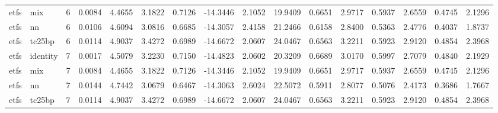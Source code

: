 \begin{tabular}{llrrrrrrrrrrrrrr}
etfs & mix & 6 & 0.0084 & 4.4655 & 3.1822 & 0.7126 & -14.3446 & 2.1052 & 19.9409 & 0.6651 & 2.9717 & 0.5937 & 2.6559 & 0.4745 & 2.1296 \\
etfs & nn & 6 & 0.0106 & 4.6094 & 3.0816 & 0.6685 & -14.3057 & 2.4158 & 21.2466 & 0.6158 & 2.8400 & 0.5363 & 2.4776 & 0.4037 & 1.8737 \\
etfs & tc25bp & 6 & 0.0114 & 4.9037 & 3.4272 & 0.6989 & -14.6672 & 2.0607 & 24.0467 & 0.6563 & 3.2211 & 0.5923 & 2.9120 & 0.4854 & 2.3968 \\
etfs & identity & 7 & 0.0017 & 4.5079 & 3.2230 & 0.7150 & -14.4823 & 2.0602 & 20.3209 & 0.6689 & 3.0170 & 0.5997 & 2.7079 & 0.4840 & 2.1929 \\
etfs & mix & 7 & 0.0084 & 4.4655 & 3.1822 & 0.7126 & -14.3446 & 2.1052 & 19.9409 & 0.6651 & 2.9717 & 0.5937 & 2.6559 & 0.4745 & 2.1296 \\
etfs & nn & 7 & 0.0144 & 4.7442 & 3.0679 & 0.6467 & -14.3063 & 2.6024 & 22.5072 & 0.5911 & 2.8077 & 0.5076 & 2.4173 & 0.3686 & 1.7667 \\
etfs & tc25bp & 7 & 0.0114 & 4.9037 & 3.4272 & 0.6989 & -14.6672 & 2.0607 & 24.0467 & 0.6563 & 3.2211 & 0.5923 & 2.9120 & 0.4854 & 2.3968 \\
\bottomrule
\end{tabular}
